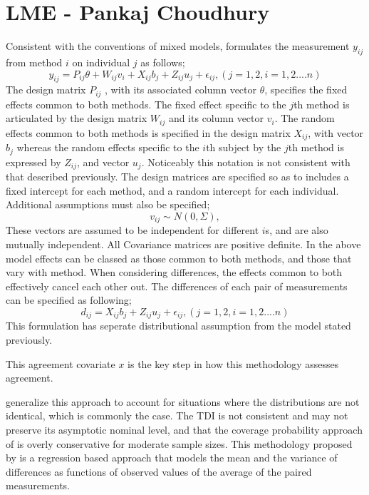 \documentclass[12pt, a4paper]{report}
\theoremstyle{plain}
\theoremstyle{definition}
\theoremstyle{remark}
\begin{document}
	\section{LME - Pankaj Choudhury}
	Consistent with the conventions of mixed models, \citep{pkc}
	formulates the measurement $y_{ij} $from method $i$ on individual
	$j$ as follows;
	\begin{equation}
	y_{ij} =P_{ij}\theta + W_{ij}v_{i} + X_{ij}b_{j} + Z_{ij}u_{j} +
	\epsilon_{ij},     (j=1,2, i=1,2....n)
	\end{equation}
	The design matrix $P_{ij}$ , with its associated column vector
	$\theta$, specifies the fixed effects common to both methods. The
	fixed effect specific to the $j$th method is articulated by the
	design matrix $W_{ij}$ and its column vector $v_{i}$. The random
	effects common to both methods is specified in the design matrix
	$X_{ij}$, with vector $b_{j}$ whereas the random effects specific
	to the $i$th subject by the $j$th method is expressed by $Z_{ij}$,
	and vector $u_{j}$. Noticeably this notation is not consistent
	with that described previously.  The design matrices are specified
	so as to includes a fixed intercept for each method, and a random
	intercept for each individual. Additional assumptions must also be
	specified;
	\begin{equation}
	v_{ij} \sim N(0,\Sigma),
	\end{equation}
	These vectors are assumed to be independent for different $i$s,
	and are also mutually independent. All Covariance matrices are
	positive definite.  In the above model effects can be classed as
	those common to both methods, and those that vary with method.
	When considering differences, the effects common to both
	effectively cancel each other out. The differences of each pair of
	measurements can be specified as following;
	\begin{equation}
	d_{ij} = X_{ij}b_{j} + Z_{ij}u_{j} + \epsilon_{ij},     (j=1,2,
	i=1,2....n)
	\end{equation}
	This formulation has seperate distributional assumption from the
	model stated previously.
	
	This agreement covariate $x$ is the key step in how this
	methodology assesses agreement.
	
	\citet{pkcng} generalize this approach to account for situations
	where the distributions are not identical, which is commonly the
	case. The TDI is not consistent and may not preserve its
	asymptotic nominal level, and that the coverage probability
	approach of \citet{lin2002} is overly conservative for moderate
	sample sizes. This methodology proposed by \citet{pkcng} is a
	regression based approach that models the mean and the variance of
	differences as functions of observed values of the average of the
	paired measurements.
	
\end{document}

